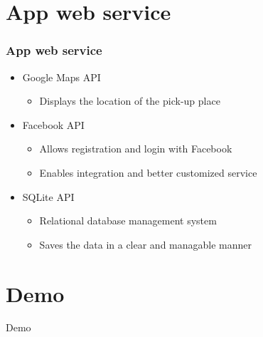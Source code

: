 \documentclass{beamer}
\begin{document}

\section{App web service}


\begin{frame}
\frametitle{App web service}
\begin{itemize}
\item Google Maps API
\begin{itemize}
\item Displays the location of the pick-up place
\end{itemize}
\item Facebook API
\begin{itemize}
\item Allows registration and login with Facebook
\item Enables integration and better customized service
\end{itemize}
\item SQLite API
\begin{itemize}
\item Relational database management system
\item Saves the data in a clear and managable manner
\end{itemize}
\end{itemize}
\end{frame}


\section{Demo}


\begin{frame}
\Huge{\centerline{Demo}}
\end{frame}

\end{document}
